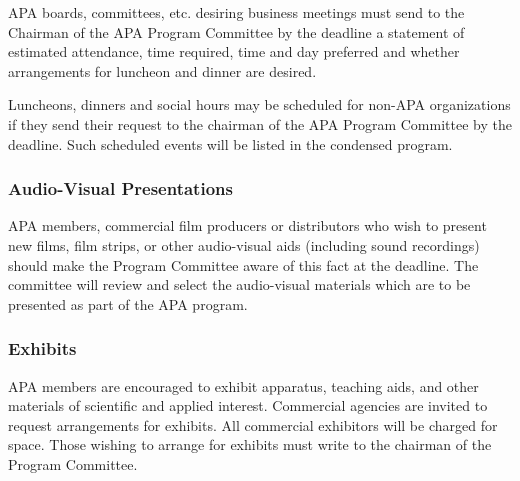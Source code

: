 {{APA boards, committees, etc. desiring business meetings must send to the Chairman of the APA Program Committee by the deadline a statement of estimated attendance, time required, time and day preferred and whether arrangements for luncheon and dinner are desired.

Luncheons, dinners and social hours may be scheduled for non-APA organizations if they send their request to the chairman of the APA Program Committee by the deadline. Such scheduled events will be listed in the condensed program.

\subsubsection{Audio-Visual Presentations}
\label{audio-visualpresentations}

APA members, commercial film producers or distributors who wish to present new films, film strips, or other audio-visual aids (including sound recordings) should make the Program Committee aware of this fact at the deadline. The committee will review and select the audio-visual materials which are to be presented as part of the APA program.

\subsubsection{Exhibits}
\label{exhibits}

APA members are encouraged to exhibit apparatus, teaching aids, and other materials of scientific and applied interest. Commercial agencies are invited to request arrangements for exhibits. All commercial exhibitors will be charged for space. Those wishing to arrange for exhibits must write to the chairman of the Program Committee.
 }%
}



